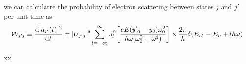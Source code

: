 we can calculatre the probability of electron scattering between states $j$ and $j'$ per unit time as
\begin{equation} \label{2.22}
    \mathcal{W}_{j'j} \equiv \dv{|a_{j'}(t)|^2}{t} =
    |U_{j'j}|^2 \sum_{l=-\infty}^{\infty} J_l^2\bigg[\frac{eE({y'}_0 - y_0)\omega_0^2}{\hbar\omega(\omega_0^2-\omega^2)}\bigg]
    \times
    \frac{2\pi}{\hbar} \delta(E_{n'} - E_{n} + l\hbar\omega)
\end{equation}




















xx
